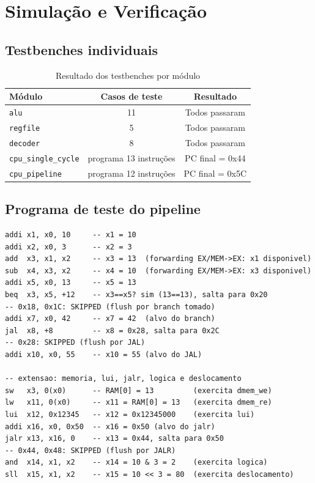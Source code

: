 \documentclass[12pt, a4paper]{article}
\newcommand{\code}[1]{\texttt{#1}}
\begin{document}
\section{Simulação e Verificação}

\subsection{Testbenches individuais}

\begin{table}[H]
  \centering
  \caption{Resultado dos testbenches por módulo}
  \small{}
  \begin{tabular}{lcc}
    \toprule
    \rowcolor{headerblue}
    \color{white}\textbf{Módulo} & \color{white}\textbf{Casos de teste} &
    \color{white}\textbf{Resultado} \\
    \midrule
    \code{alu}                & 11 & Todos passaram \\
    \code{regfile}            & 5  & Todos passaram \\
    \code{decoder}            & 8  & Todos passaram \\
    \code{cpu\_single\_cycle} & programa 13 instruções & PC final = 0x44 \\
    \code{cpu\_pipeline}      & programa 12 instruções & PC final = 0x5C \\
    \bottomrule
  \end{tabular}
\end{table}

\subsection{Programa de teste do pipeline}

\begin{lstlisting}[style=vhdlstyle, language={},
  caption={Programa de teste do pipeline (assembly)}]
addi x1, x0, 10     -- x1 = 10
addi x2, x0, 3      -- x2 = 3
add  x3, x1, x2     -- x3 = 13  (forwarding EX/MEM->EX: x1 disponivel)
sub  x4, x3, x2     -- x4 = 10  (forwarding EX/MEM->EX: x3 disponivel)
addi x5, x0, 13     -- x5 = 13
beq  x3, x5, +12    -- x3==x5? sim (13==13), salta para 0x20
-- 0x18, 0x1C: SKIPPED (flush por branch tomado)
addi x7, x0, 42     -- x7 = 42  (alvo do branch)
jal  x8, +8         -- x8 = 0x28, salta para 0x2C
-- 0x28: SKIPPED (flush por JAL)
addi x10, x0, 55    -- x10 = 55 (alvo do JAL)

-- extensao: memoria, lui, jalr, logica e deslocamento
sw   x3, 0(x0)      -- RAM[0] = 13         (exercita dmem_we)
lw   x11, 0(x0)     -- x11 = RAM[0] = 13   (exercita dmem_re)
lui  x12, 0x12345   -- x12 = 0x12345000    (exercita lui)
addi x16, x0, 0x50  -- x16 = 0x50 (alvo do jalr)
jalr x13, x16, 0    -- x13 = 0x44, salta para 0x50
-- 0x44, 0x48: SKIPPED (flush por JALR)
and  x14, x1, x2    -- x14 = 10 & 3 = 2    (exercita logica)
sll  x15, x1, x2    -- x15 = 10 << 3 = 80  (exercita deslocamento)
\end{lstlisting}
\end{document}
